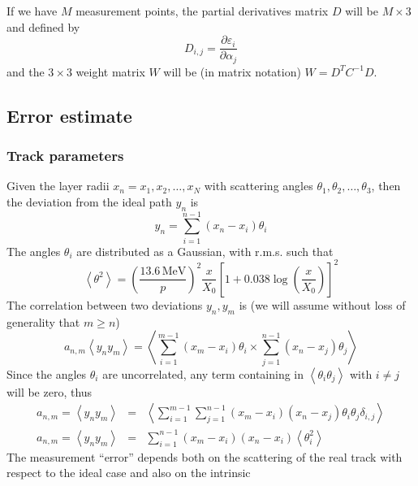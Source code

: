 \documentclass[10pt,a4paper]{article}
\begin{document}
If we have $M$ measurement points, the partial derivatives matrix $D$
will be $M\times 3$ and defined by
\begin{equation}
  D_{i,j} = \frac { \partial \varepsilon_i} {\partial \alpha_j}
\end{equation}
and the $3\times 3$ weight matrix $W$ will be (in matrix notation)
$W=D^{T}C^{-1}D$.
\subsection{Error estimate}
\subsubsection{Track parameters}
Given the layer radii $x_n = x_1, x_2, \ldots, x_N$ with scattering
angles $\theta_1, \theta_2, \ldots, \theta_3$, then the deviation from
the ideal path $y_n$ is
\begin{equation}
  y_n=\sum_{i=1}^{n-1} \left (  x_n - x_i \right ) \theta_i
\end{equation}
The angles $\theta_i$ are distributed as a Gaussian, with r.m.s. such
that
\begin{equation}
  \left < \theta^2 \right > =
  \left ( \frac {13.6\,\mathrm{MeV}} {p} \right )^2
  \frac x {X_0}
  \left [ 1+ 0.038 \log \left ( \frac x {X_0} \right ) \right ] ^2
\end{equation}
The correlation between two deviations $y_n, y_m$ is (we will assume
without loss of generality that $m \geq n$)
\begin{equation}
  a_{n,m}\left < y_n y_m \right > =
  \left <
    \sum_{i=1}^{m-1} \left (  x_m - x_i \right ) \theta_i
    \times
    \sum_{j=1}^{n-1} \left (  x_n - x_j \right ) \theta_j
  \right >
\end{equation}
Since the angles $\theta_i$ are uncorrelated, any term containing in
$\left < \theta_i \theta_j \right >$ with $i\neq j$ will be zero, thus
\begin{eqnarray}
  a_{n,m} = \left < y_n y_m \right > & = &
  \left <
    \sum_{i=1}^{m-1} \sum_{j=1}^{n-1}
    \left (  x_m - x_i \right )
    \left (  x_n - x_j \right ) \theta_i \theta_j \delta_{i,j}
  \right > \nonumber \\
  a_{n,m} = \left < y_n y_m \right > & = &
  \sum_{i=1}^{n-1} 
  \left (  x_m - x_i \right )
  \left (  x_n - x_i \right )  \left < \theta_i^2 \right > 
\end{eqnarray}
The measurement ``error'' depends both on the scattering of the real
track with respect to the ideal case and also on the intrinsic
\end{document}
